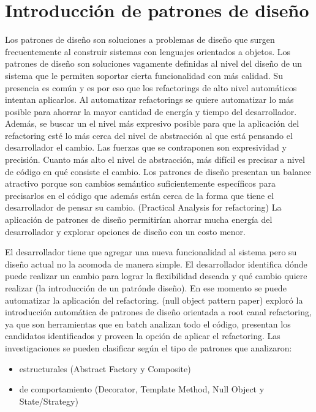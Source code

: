 \section{Introducción de patrones de diseño}
Los patrones de diseño son soluciones a problemas de diseño que surgen frecuentemente al construir
sistemas con lenguajes orientados a objetos. Los patrones de diseño son soluciones vagamente
definidas al nivel del diseño de un sistema que le permiten soportar cierta funcionalidad con más
calidad. Su presencia es común y es por eso que los refactorings de alto nivel automáticos intentan
aplicarlos. Al automatizar refactorings se quiere automatizar lo más posible para ahorrar la mayor
cantidad de energía y tiempo del desarrollador. Además, se buscar un el nivel más expresivo posible
para que la aplicación del refactoring esté lo más cerca del nivel de abstracción al que está
pensando el desarrollador el cambio. Las fuerzas que se contraponen son expresividad y precisión.
Cuanto más alto el nivel de abstracción, más difícil es precisar a nivel de código en qué consiste
el cambio. Los patrones de diseño presentan un balance atractivo porque son cambios semántico
suficientemente específicos para precisarlos en el código que además están cerca de la forma que
tiene el desarrollador de pensar su cambio.
(Practical Analysis for refactoring) La aplicación de patrones de diseño permitirían ahorrar mucha
energía del desarrollador y explorar opciones de diseño con un costo menor.

El desarrollador tiene que agregar una nueva funcionalidad al sistema pero su diseño actual no la
acomoda de manera simple. El desarrollador identifica dónde puede realizar un cambio para lograr la
flexibilidad deseada y qué cambio quiere realizar (la introducción de un patrónde diseño). En ese
momento se puede automatizar la aplicación del refactoring.
(null object pattern paper) exploró la introducción automática de patrones de diseño orientada a root canal
refactoring, ya que son herramientas que en batch analizan todo el código, presentan los candidatos
identificados y proveen la opción de aplicar el refactoring. Las investigaciones se pueden
clasificar según el tipo de patrones que analizaron:

\begin{itemize}
    \item estructurales (Abstract Factory y Composite)
    \item de comportamiento (Decorator, Template Method, Null Object y State/Strategy)
\end{itemize}

